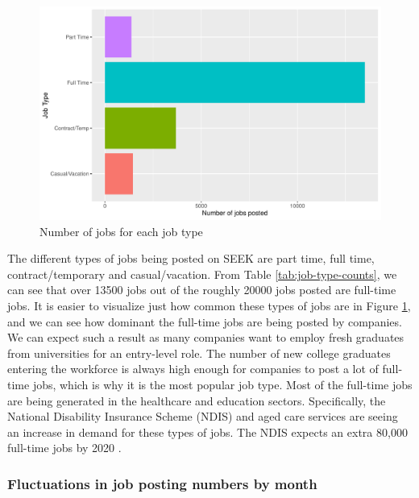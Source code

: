 \documentclass[11pt,a4paper,]{article}
\begin{document}
\begin{figure}

{\centering \includegraphics{Team_JHDP_Assignment4_files/figure-latex/job-types-1} 

}

\caption{Number of jobs for each job type}\label{fig:job-types}
\end{figure}

The different types of jobs being posted on SEEK are part time, full time, contract/temporary and casual/vacation. From Table \ref{tab:job-type-counts}, we can see that over 13500 jobs out of the roughly 20000 jobs posted are full-time jobs. It is easier to visualize just how common these types of jobs are in Figure \ref{fig:job-types}, and we can see how dominant the full-time jobs are being posted by companies. We can expect such a result as many companies want to employ fresh graduates from universities for an entry-level role. The number of new college graduates entering the workforce is always high enough for companies to post a lot of full-time jobs, which is why it is the most popular job type. Most of the full-time jobs are being generated in the healthcare and education sectors. Specifically, the National Disability Insurance Scheme (NDIS) and aged care services are seeing an increase in demand for these types of jobs. The NDIS expects an extra 80,000 full-time jobs by 2020 \textcite{aigroup}.

\hypertarget{fluctuations-in-job-posting-numbers-by-month}{%
\subsubsection{Fluctuations in job posting numbers by month}\label{fluctuations-in-job-posting-numbers-by-month}}
\end{document}
